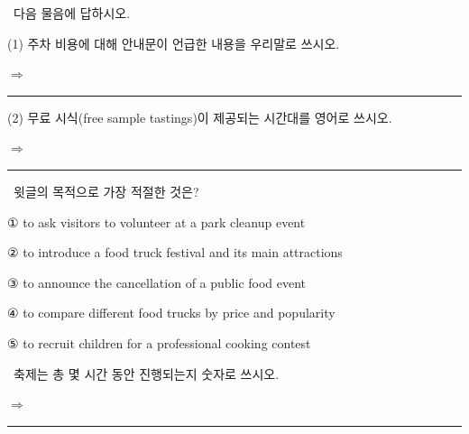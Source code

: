 \documentclass[11pt,a4paper]{article}
\newcommand{\qno}[1]{\par\vspace{8pt}\noindent{\sffamily\bfseries #1.}\ }
\newcommand{\instr}[1]{{\sffamily #1}\par\vspace{3pt}}
\begin{document}
\qno{2}\instr{[서술형] 다음 물음에 답하시오.}
\vspace{2pt}\par\noindent
(1) 주차 비용에 대해 안내문이 언급한 내용을 우리말로 쓰시오.
\par\vspace{4pt}\noindent
$\Rightarrow$ \rule{10cm}{0.4pt}
\vspace{10pt}\par\noindent
(2) 무료 시식(free sample tastings)이 제공되는 시간대를 영어로 쓰시오.
\par\vspace{4pt}\noindent
$\Rightarrow$ \rule{10cm}{0.4pt}

\qno{3}\instr{윗글의 목적으로 가장 적절한 것은?}
\begin{choices}
\item ① to ask visitors to volunteer at a park cleanup event
\item ② to introduce a food truck festival and its main attractions
\item ③ to announce the cancellation of a public food event
\item ④ to compare different food trucks by price and popularity
\item ⑤ to recruit children for a professional cooking contest
\end{choices}

\qno{4}\instr{[서술형] 축제는 총 몇 시간 동안 진행되는지 숫자로 쓰시오.}
\par\vspace{4pt}\noindent
$\Rightarrow$ \rule{4cm}{0.4pt}
\end{document}
